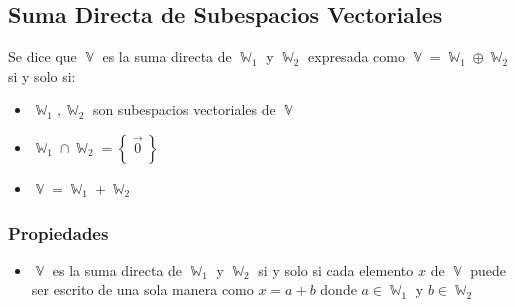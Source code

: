 \documentclass[12pt, fleqn]{report}                             %
\theoremstyle{break}                                            %
\DeclareMathOperator \VectorSet    {\mathbb{V}}                 %
\DeclareMathOperator \SubVectorSet {\mathbb{W}}                 %
\newcommand{\Set}[1]    {\left\{ \; #1 \; \right\}}             %
\begin{document}
            \clearpage
            \subsection{Suma Directa de Subespacios Vectoriales}

                Se dice que $\VectorSet$ es la suma directa de $\SubVectorSet_1$ y $\SubVectorSet_2$
                expresada como $\VectorSet = \SubVectorSet_1 \oplus \SubVectorSet_2$ si y solo si:

                \begin{itemize}
                    \item $\SubVectorSet_1, \SubVectorSet_2$ son subespacios vectoriales de $\VectorSet$
                    \item $\SubVectorSet_1 \cap \SubVectorSet_2 = \Set{\vec{0}}$
                    \item $\VectorSet = \SubVectorSet_1 + \SubVectorSet_2$
                \end{itemize}


            \vspace{1em}
            \subsubsection{Propiedades}

                \begin{itemize}
                    
                    \item 
                        $\VectorSet$ es la suma directa de $\SubVectorSet_1$ y $\SubVectorSet_2$ si y solo si
                        cada elemento $x$ de $\VectorSet$ puede ser escrito de una sola manera como 
                        $x = a + b$ donde $a \in \SubVectorSet_1$ y $b \in \SubVectorSet_2$

                \end{itemize}


        \clearpage
\end{document}
